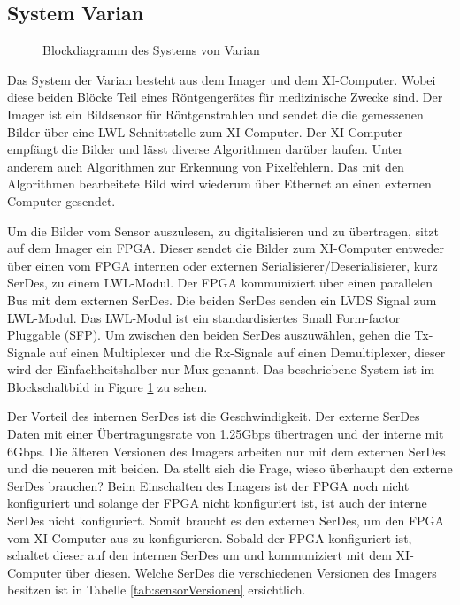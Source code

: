 \documentclass{article}
\begin{document}
\subsection{System Varian}
\begin{figure}[tb]
    \caption{Blockdiagramm des Systems von Varian}
    \label{fig:bd_varian}
\end{figure}

Das System der Varian besteht aus dem Imager und dem XI-Computer. Wobei diese beiden Blöcke Teil eines Röntgengerätes für medizinische Zwecke sind. Der Imager ist ein Bildsensor für Röntgenstrahlen und sendet die die gemessenen Bilder über eine LWL-Schnittstelle zum XI-Computer. Der XI-Computer empfängt die Bilder und lässt diverse Algorithmen darüber laufen. Unter anderem auch Algorithmen zur Erkennung von Pixelfehlern. Das mit den Algorithmen bearbeitete Bild wird wiederum über Ethernet an einen externen Computer gesendet.

Um die Bilder vom Sensor auszulesen, zu digitalisieren und zu übertragen, sitzt auf dem Imager ein FPGA. Dieser sendet die Bilder zum XI-Computer entweder über einen vom FPGA internen oder externen Serialisierer/Deserialisierer, kurz SerDes, zu einem LWL-Modul. Der FPGA kommuniziert über einen parallelen Bus mit dem externen SerDes. Die beiden SerDes senden ein LVDS Signal zum LWL-Modul. Das LWL-Modul ist ein standardisiertes Small Form-factor Pluggable (SFP). Um zwischen den beiden SerDes auszuwählen, gehen die Tx-Signale auf einen Multiplexer und die Rx-Signale auf einen Demultiplexer, dieser wird der Einfachheitshalber nur Mux genannt. Das beschriebene System ist im Blockschaltbild in Figure \ref{fig:bd_varian} zu sehen.

Der Vorteil des internen SerDes ist die Geschwindigkeit. Der externe SerDes Daten mit einer Übertragungsrate von 1.25Gbps übertragen und der interne mit 6Gbps. Die älteren Versionen des Imagers arbeiten nur mit dem externen SerDes und die neueren mit beiden. Da stellt sich die Frage, wieso überhaupt den externe SerDes brauchen? Beim Einschalten des Imagers ist der FPGA noch nicht konfiguriert und solange der FPGA nicht konfiguriert ist, ist auch der interne SerDes nicht konfiguriert. Somit braucht es den externen SerDes, um den FPGA vom XI-Computer aus zu konfigurieren. Sobald der FPGA konfiguriert ist, schaltet dieser auf den internen SerDes um und kommuniziert mit dem XI-Computer über diesen. Welche SerDes die verschiedenen Versionen des Imagers besitzen ist in Tabelle \ref{tab:sensorVersionen} ersichtlich.
\end{document}
